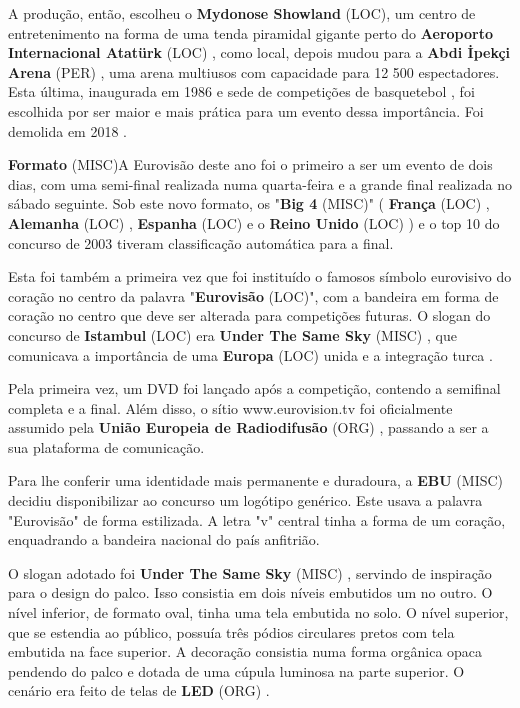 \documentclass[12pt,a4paper]{article}
\begin{document}
A produção, então, escolheu o \textbf{Mydonose Showland} (LOC), um centro de entretenimento na forma de uma tenda piramidal gigante perto do \textbf{Aeroporto Internacional Atatürk} (LOC) , como local, depois mudou para a \textbf{Abdi İpekçi Arena} (PER) , uma arena multiusos com capacidade para 12 500 espectadores. Esta última, inaugurada em 1986 e sede de competições de basquetebol , foi escolhida por ser maior e mais prática para um evento dessa importância. Foi demolida em 2018 .



\textbf{Formato} (MISC)A Eurovisão deste ano foi o primeiro a ser um evento de dois dias, com uma semi-final realizada numa quarta-feira e a grande final realizada no sábado seguinte. Sob este novo formato, os "\textbf{Big 4} (MISC)" ( \textbf{França} (LOC) , \textbf{Alemanha} (LOC) , \textbf{Espanha} (LOC) e o \textbf{Reino Unido} (LOC) ) e o top 10 do concurso de 2003 tiveram classificação automática para a final.

Esta foi também a primeira vez que foi instituído o famosos símbolo eurovisivo do coração no centro da palavra "\textbf{Eurovisão} (LOC)", com a bandeira em forma de coração no centro que deve ser alterada para competições futuras. O slogan do concurso de \textbf{Istambul} (LOC) era \textbf{Under The Same Sky} (MISC) , que comunicava a importância de uma \textbf{Europa} (LOC) unida e a integração turca .

Pela primeira vez, um DVD foi lançado após a competição, contendo a semifinal completa e a final. Além disso, o sítio www.eurovision.tv foi oficialmente assumido pela \textbf{União Europeia de Radiodifusão} (ORG) , passando a ser a sua plataforma de comunicação.

Para lhe conferir uma identidade mais permanente e duradoura, a \textbf{EBU} (MISC) decidiu disponibilizar ao concurso um logótipo genérico. Este usava a palavra "Eurovisão" de forma estilizada. A letra "v" central tinha a forma de um coração, enquadrando a bandeira nacional do país anfitrião.

O slogan adotado foi \textbf{Under The Same Sky} (MISC) , servindo de inspiração para o design do palco. Isso consistia em dois níveis embutidos um no outro. O nível inferior, de formato oval, tinha uma tela embutida no solo. O nível superior, que se estendia ao público, possuía três pódios circulares pretos com tela embutida na face superior. A decoração consistia numa forma orgânica opaca pendendo do palco e dotada de uma cúpula luminosa na parte superior. O cenário era feito de telas de \textbf{LED} (ORG) .
\end{document}
